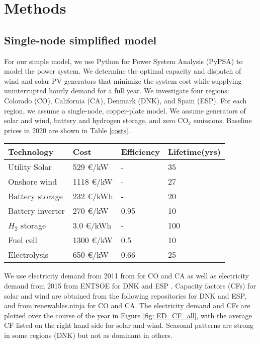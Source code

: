 \documentclass[lettersize,journal]{IEEEtran}
\begin{document}
\section{Methods}
\subsection{Single-node simplified model}
For our simple model, we use Python for Power System Analysis (PyPSA) \cite{brown_pypsa_2018} to model the power system. We determine the optimal capacity and dispatch of wind and solar PV generators that minimize the system cost while supplying uninterrupted hourly demand for a full year. We investigate four regions: Colorado (CO), California (CA), Denmark (DNK), and Spain (ESP). For each region, we assume a single-node, copper-plate model. We assume generators of solar and wind, battery and hydrogen storage, and zero CO$_2$ emissions. Baseline prices in 2020 are shown in Table \ref{costs}.


\begin{center}

\begin{tabular}{llll}
\toprule
Technology & Cost & Efficiency & Lifetime(yrs) \\
\midrule
Utility Solar        &      529 €/kW   & -  &   35  \\
Onshore wind         &     1118  €/kW  & -   &   27  \\
Battery storage         &     232 €/kWh   & - &  20  \\
Battery inverter          &     270 €/kW & 0.95 & 10   \\
$H_{2}$ storage        &     3.0  €/kWh & - &   100  \\
Fuel cell &           1300 €/kW   &    0.5  &    10  \\
Electrolysis &           650 €/kW  & 0.66  &  25  \\
\bottomrule
\end{tabular}
\label{costs} 

\end{center}

We use electricity demand from 2011 from \cite{welty_ethan_US_ED} for CO and CA as well as electricity demand from 2015 from ENTSOE for DNK and ESP \cite{entsoe_timeseries}. Capacity factors (CFs) for solar and wind are obtained from the following repositories for DNK and ESP\cite{victoria_PV_timeseries, victoria_wind_timeseries}, and from  renewables.ninja \cite{renewableninja, STAFFELL20161224, PFENNINGER20161251} for CO and CA. The electricity demand and CFs are plotted over the course of the year in Figure \ref{fig: ED_CF_all}, with the average CF listed on the right hand side for solar and wind. Seasonal patterns are strong in some regions (DNK) but not as dominant in others.
\end{document}
